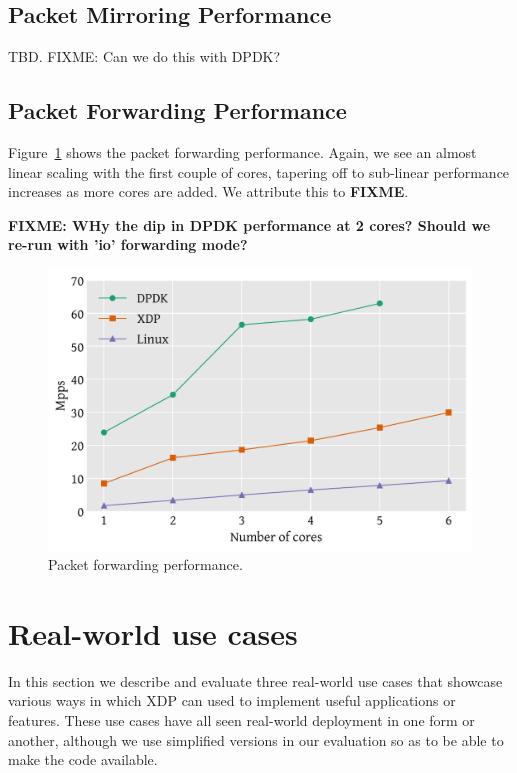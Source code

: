 \documentclass[10pt,sigconf]{acmart}
\begin{document}
\subsection{Packet Mirroring Performance}
\label{sec:pack-mirr-perf}

TBD. FIXME: Can we do this with DPDK?

\subsection{Packet Forwarding Performance}
\label{sec:pack-forw-perf}
Figure~\ref{fig:redirect-test} shows the packet forwarding performance. Again,
we see an almost linear scaling with the first couple of cores, tapering off to
sub-linear performance increases as more cores are added. We attribute this to
\textbf{FIXME}.

\textbf{FIXME: WHy the dip in DPDK performance at 2 cores? Should we re-run with
'io' forwarding mode?}


\begin{figure}[t]
\centering
\includegraphics[width=\linewidth]{figures/redirect-test.pdf}
\caption{\label{fig:redirect-test} Packet forwarding performance.}
\end{figure}

\section{Real-world use cases}
\label{sec:usecases}
In this section we describe and evaluate three real-world use cases that
showcase various ways in which XDP can used to implement useful applications or
features. These use cases have all seen real-world deployment in one form or
another, although we use simplified versions in our evaluation so as to be able
to make the code available.
\end{document}
